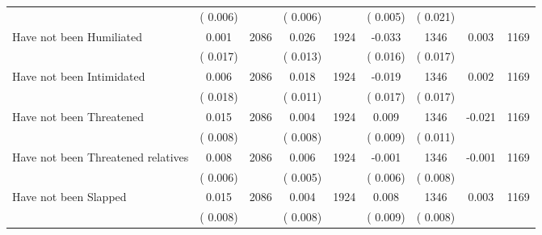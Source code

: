 \begin{tabular}{l*{8}{c}}
                       &       (       0.006)            &                               &       (       0.006)            &                               &       (       0.005)            &       (       0.021) &                  \\
Have not been Humiliated        &              0.001      &       2086       &              0.026      &       1924       &             -0.033      &       1346  &        0.003 &       1169       \\
                       &       (       0.017)            &                               &       (       0.013)            &                               &       (       0.016)            &       (       0.017) &                  \\
Have not been Intimidated        &              0.006      &       2086       &              0.018      &       1924       &             -0.019      &       1346  &        0.002 &       1169       \\
                       &       (       0.018)            &                               &       (       0.011)            &                               &       (       0.017)            &       (       0.017) &                  \\
Have not been Threatened        &              0.015      &       2086       &              0.004      &       1924       &              0.009      &       1346  &       -0.021 &       1169       \\
                       &       (       0.008)            &                               &       (       0.008)            &                               &       (       0.009)            &       (       0.011) &                  \\
Have not been Threatened relatives        &              0.008      &       2086       &              0.006      &       1924       &             -0.001      &       1346  &       -0.001 &       1169       \\
                       &       (       0.006)            &                               &       (       0.005)            &                               &       (       0.006)            &       (       0.008) &                  \\
Have not been Slapped        &              0.015      &       2086       &              0.004      &       1924       &              0.008      &       1346  &        0.003 &       1169       \\
                       &       (       0.008)            &                               &       (       0.008)            &                               &       (       0.009)            &       (       0.008) &                  \\

\end{tabular}
